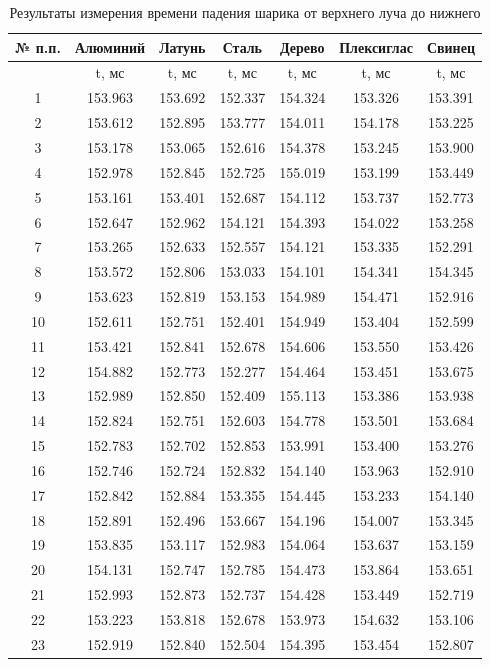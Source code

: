 \begin{center}
\begin{table}[h!]
\centering
\caption{Результаты измерения времени падения шарика от верхнего луча до нижнего}
\label{tabl:2}
\begin{tabular}{|c|c|c|c|c|c|c|}
\hline
№ п.п.& Алюминий & Латунь & Сталь & Дерево & Плексиглас & Свинец \\
\hline
{}&t, мс&t, мс&t, мс&t, мс&t, мс&t, мс\\
\hline
1&153.963&153.692&152.337&154.324&153.326&153.391 \\
2&153.612&152.895&153.777&154.011&154.178&153.225 \\
3&153.178&153.065&152.616&154.378&153.245&153.900 \\
4&152.978&152.845&152.725&155.019&153.199&153.449 \\
5&153.161&153.401&152.687&154.112&153.737&152.773 \\
6&152.647&152.962&154.121&154.393&154.022&153.258 \\
7&153.265&152.633&152.557&154.121&153.335&152.291 \\
8&153.572&152.806&153.033&154.101&154.341&154.345 \\
9&153.623&152.819&153.153&154.989&154.471&152.916 \\
10&152.611&152.751&152.401&154.949&153.404&152.599 \\
11&153.421&152.841&152.678&154.606&153.550&153.426 \\
12&154.882&152.773&152.277&154.464&153.451&153.675 \\
13&152.989&152.850&152.409&155.113&153.386&153.938 \\
14&152.824&152.751&152.603&154.778&153.501&153.684 \\
15&152.783&152.702&152.853&153.991&153.400&153.276 \\
16&152.746&152.724&152.832&154.140&153.963&152.910 \\
17&152.842&152.884&153.355&154.445&153.233&154.140 \\
18&152.891&152.496&153.667&154.196&154.007&153.345 \\
19&153.835&153.117&152.983&154.064&153.637&153.159 \\
20&154.131&152.747&152.785&154.473&153.864&153.651 \\
21&152.993&152.873&152.737&154.428&153.449&152.719 \\
22&153.223&153.818&152.678&153.973&154.632&153.106 \\
23&152.919&152.840&152.504&154.395&153.454&152.807 \\

\end{tabular}
\end{table}
\end{center}
